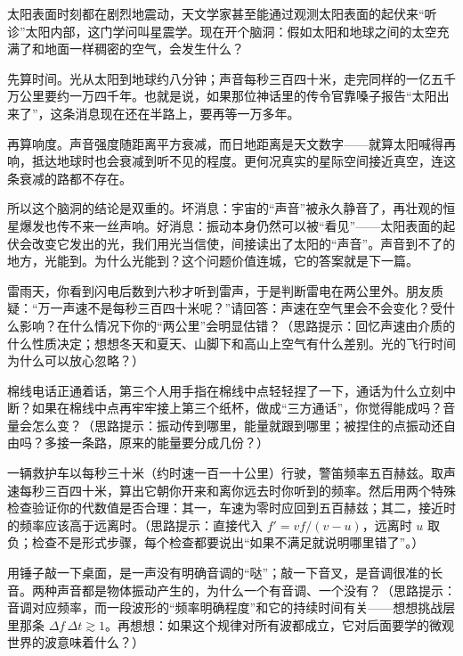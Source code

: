
\begin{thought}[如果星际空间充满空气]
太阳表面时刻都在剧烈地震动，天文学家甚至能通过观测太阳表面的起伏来“听诊”太阳内部，这门学问叫星震学。现在开个脑洞：假如太阳和地球之间的太空充满了和地面一样稠密的空气，会发生什么？

先算时间。光从太阳到地球约八分钟；声音每秒三百四十米，走完同样的一亿五千万公里要约一万四千年。也就是说，如果那位神话里的传令官靠嗓子报告“太阳出来了”，这条消息现在还在半路上，要再等一万多年。

再算响度。声音强度随距离平方衰减，而日地距离是天文数字——就算太阳喊得再响，抵达地球时也会衰减到听不见的程度。更何况真实的星际空间接近真空，连这条衰减的路都不存在。

所以这个脑洞的结论是双重的。坏消息：宇宙的“声音”被永久静音了，再壮观的恒星爆发也传不来一丝声响。好消息：振动本身仍然可以被“看见”——太阳表面的起伏会改变它发出的光，我们用光当信使，间接读出了太阳的“声音”。声音到不了的地方，光能到。为什么光能到？这个问题价值连城，它的答案就是下一篇。
\end{thought}

\begin{puzzles}
\item 雷雨天，你看到闪电后数到六秒才听到雷声，于是判断雷电在两公里外。朋友质疑：“万一声速不是每秒三百四十米呢？”请回答：声速在空气里会不会变化？受什么影响？在什么情况下你的“两公里”会明显估错？（思路提示：回忆声速由介质的什么性质决定；想想冬天和夏天、山脚下和高山上空气有什么差别。光的飞行时间为什么可以放心忽略？）

\item 棉线电话正通着话，第三个人用手指在棉线中点轻轻捏了一下，通话为什么立刻中断？如果在棉线中点再牢牢接上第三个纸杯，做成“三方通话”，你觉得能成吗？音量会怎么变？（思路提示：振动传到哪里，能量就跟到哪里；被捏住的点振动还自由吗？多接一条路，原来的能量要分成几份？）

\item 一辆救护车以每秒三十米（约时速一百一十公里）行驶，警笛频率五百赫兹。取声速每秒三百四十米，算出它朝你开来和离你远去时你听到的频率。然后用两个特殊检查验证你的代数值是否合理：其一，车速为零时应回到五百赫兹；其二，接近时的频率应该高于远离时。（思路提示：直接代入 \(f'=vf/(v-u)\)，远离时 \(u\) 取负；检查不是形式步骤，每个检查都要说出“如果不满足就说明哪里错了”。）

\item 用锤子敲一下桌面，是一声没有明确音调的“哒”；敲一下音叉，是音调很准的长音。两种声音都是物体振动产生的，为什么一个有音调、一个没有？（思路提示：音调对应频率，而一段波形的“频率明确程度”和它的持续时间有关——想想挑战层里那条 \(\Delta f\,\Delta t\gtrsim 1\)。再想想：如果这个规律对所有波都成立，它对后面要学的微观世界的波意味着什么？）
\end{puzzles}
